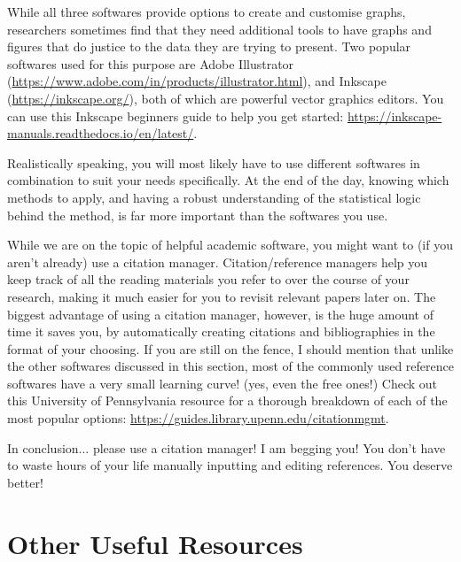 \documentclass{article}
\begin{document}
While all three softwares provide options to create and customise graphs, researchers sometimes find that they need additional tools to have graphs and figures that do justice to the data they are trying to present. Two popular softwares used for this purpose are Adobe Illustrator (\href{https://www.adobe.com/in/products/illustrator.html}{https://www.adobe.com/in/products/illustrator.html}), and Inkscape (\href{https://inkscape.org/}{https://inkscape.org/}), both of which are powerful vector graphics editors. You can use this Inkscape beginners guide to help you get started: \href{https://inkscape-manuals.readthedocs.io/en/latest/}{https://inkscape-manuals.readthedocs.io/en/latest/}.

Realistically speaking, you will most likely have to use different softwares in combination to suit your needs specifically. At the end of the day, knowing which methods to apply, and having a robust understanding of the statistical logic behind the method, is far more important than the softwares you use.

While we are on the topic of helpful academic software, you might want to (if you aren’t already) use a citation manager. Citation/reference managers help you keep track of all the reading materials you refer to over the course of your research, making it much easier for you to revisit relevant papers later on. The biggest advantage of using a citation manager, however, is the huge amount of time it saves you, by automatically creating citations and bibliographies in the format of your choosing. If you are still on the fence, I should mention that unlike the other softwares discussed in this section, most of the commonly used reference softwares have a very small learning curve! (yes, even the free ones!) Check out this University of Pennsylvania resource for a thorough breakdown of each of the most popular options: \href{https://guides.library.upenn.edu/citationmgmt}{https://guides.library.upenn.edu/citationmgmt}. 

In conclusion... please use a citation manager! I am begging you! You don’t have to waste hours of your life manually inputting and editing references. You deserve better!

\section{Other Useful Resources}
\end{document}
